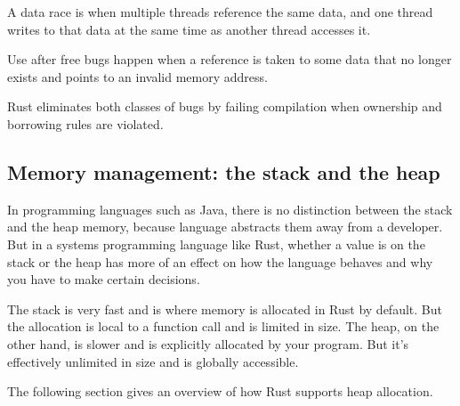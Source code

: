 

A data race is when multiple threads reference the same data, and one thread writes to that data at the same time as another thread accesses it.

Use after free bugs happen when a reference is taken to some data that no longer exists and points to an invalid memory address.

Rust eliminates both classes of bugs by failing compilation when ownership and borrowing rules are violated.

\subsection{Memory management: the stack and the heap}
In programming languages such as Java, there is no distinction between the stack and the heap memory, because language abstracts them away from a developer. But in a systems programming language like Rust, whether a value is on the stack or the heap has more of an effect on how the language behaves and why you have to make certain decisions.

The stack is very fast and is where memory is allocated in Rust by default. But the allocation is local to a function call and is limited in size. The heap, on the other hand, is slower and is explicitly allocated by your program. But it’s effectively unlimited in size and is globally accessible.

The following section gives an overview of how Rust supports heap allocation.

